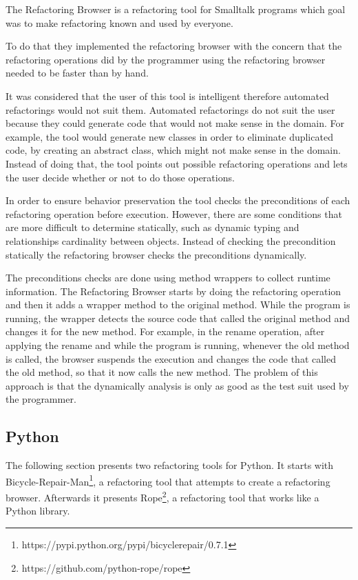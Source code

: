 The Refactoring Browser \cite{roberts1997refactoring} is a refactoring tool for
Smalltalk programs which goal was to make refactoring known and used by everyone.

To do that they implemented the refactoring browser with the concern that the
 refactoring operations did by the programmer using the refactoring browser needed to be faster than by hand.

It was considered that the user of this tool is intelligent therefore automated
refactorings would not suit them.
Automated refactorings do not suit the user because they could generate code that
 would not make sense in the domain.
For example, the tool would generate new classes in order to eliminate duplicated
code, by creating an abstract class, which might not make sense in the domain.
Instead of doing that, the tool points out possible refactoring operations and
lets the user decide whether or not to do those operations.

In order to ensure behavior preservation the tool checks the preconditions
of each refactoring operation before execution.
However, there are some conditions that are more difficult to determine statically,
 such as dynamic typing and relationships cardinality between objects.
Instead of checking the precondition statically the refactoring browser checks
the preconditions dynamically.

The preconditions checks are done using method wrappers to collect runtime information.
The Refactoring Browser starts by doing the refactoring operation and then it
adds a wrapper method to the original method.
While the program is running, the wrapper detects the source code that called
the original method and changes it for the new method.
For example, in the rename operation, after applying the rename and while the
program is running, whenever the old method is called, the browser suspends the
execution and changes the code that called the old method, so that it now calls the new method.
The problem of this approach is that the dynamically analysis is only as good
as the test suit used by the programmer.


\subsection{Python}

The following section presents two refactoring tools for Python.
It starts with Bicycle-Repair-Man\footnote{https://pypi.python.org/pypi/bicyclerepair/0.7.1},
 a refactoring tool that attempts to create a refactoring browser.
Afterwards it presents Rope\footnote{https://github.com/python-rope/rope}, a
refactoring tool that works like a Python library.

